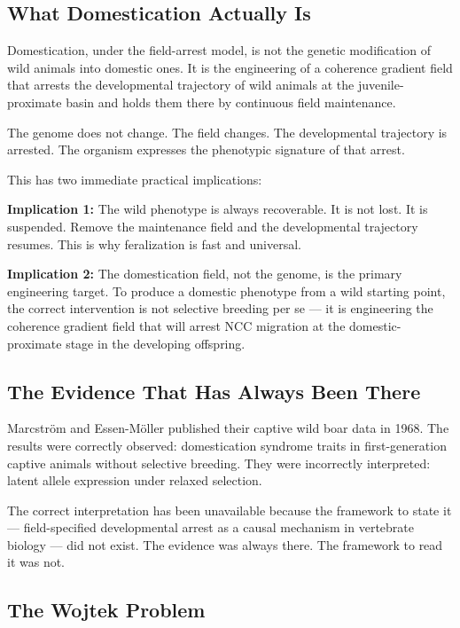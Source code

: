 \documentclass[11pt, a4paper]{article}
\begin{document}
\subsection{What Domestication Actually Is}

Domestication, under the field-arrest model, is not
the genetic modification of wild animals into domestic
ones. It is the engineering of a coherence gradient
field that arrests the developmental trajectory of
wild animals at the juvenile-proximate basin and holds
them there by continuous field maintenance.

The genome does not change.
The field changes.
The developmental trajectory is arrested.
The organism expresses the phenotypic signature
of that arrest.

This has two immediate practical implications:

\textbf{Implication 1:} The wild phenotype is
always recoverable. It is not lost. It is suspended.
Remove the maintenance field and the developmental
trajectory resumes. This is why feralization is
fast and universal.

\textbf{Implication 2:} The domestication field,
not the genome, is the primary engineering target.
To produce a domestic phenotype from a wild
starting point, the correct intervention is not
selective breeding per se --- it is engineering
the coherence gradient field that will arrest
NCC migration at the domestic-proximate stage in
the developing offspring.

\subsection{The Evidence That Has Always Been
There}

Marcstr\"{o}m and Essen-M\"{o}ller published their
captive wild boar data in 1968. The results were
correctly observed: domestication syndrome traits
in first-generation captive animals without
selective breeding. They were incorrectly interpreted:
latent allele expression under relaxed selection.

The correct interpretation has been unavailable
because the framework to state it --- field-specified
developmental arrest as a causal mechanism in
vertebrate biology --- did not exist. The evidence
was always there. The framework to read it was not.

\subsection{The Wojtek Problem}
\end{document}
